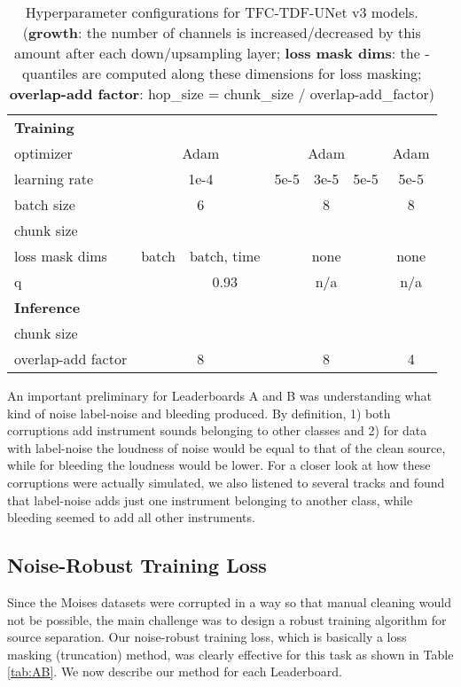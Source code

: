 \documentclass[10pt]{article}
\begin{document}
\begin{table*}[t]
\begin{tabular}{l|cc|ccc|c}
\hline
\textbf{Training} &  &  &  &  &  &  \\
\multicolumn{1}{l|}{optimizer} & \multicolumn{2}{c|}{Adam} & \multicolumn{3}{c|}{Adam} & Adam\\
\multicolumn{1}{l|}{learning rate} & \multicolumn{2}{c|}{1e-4} & 5e-5 & 3e-5 & 5e-5 & 5e-5\\
\multicolumn{1}{l|}{batch size} & \multicolumn{2}{c|}{6} & \multicolumn{3}{c|}{8} & 8\\
\multicolumn{1}{l|}{chunk size} & \multicolumn{2}{c|}{} & \multicolumn{3}{c|}{} & \\
loss mask dims & batch & batch, time & \multicolumn{3}{c|}{none} & none\\ 
q &  & 0.93 & \multicolumn{3}{c|}{n/a} & n/a\\

\hline
\textbf{Inference} &  &  &  &  &  &  \\
\multicolumn{1}{l|}{chunk size} & \multicolumn{2}{c|}{} & \multicolumn{3}{c|}{} & \\
\multicolumn{1}{l|}{overlap-add factor} & \multicolumn{2}{c|}{8} & \multicolumn{3}{c|}{8} & 4\\ 

\hline
\hline
\end{tabular}
\caption{
Hyperparameter configurations for TFC-TDF-UNet v3 models.  
(\textbf{growth}: the number of channels is increased/decreased by this amount after each down/upsampling layer; 
\textbf{loss mask dims}: the -quantiles are computed along these dimensions for loss masking;
\textbf{overlap-add factor}: hop\_size = chunk\_size / overlap-add\_factor)
}
\label{tab:cfg}
\end{table*}
\endgroup


An important preliminary for Leaderboards A and B was understanding what kind of noise label-noise and bleeding produced. By definition, 1) both corruptions add instrument sounds belonging to other classes and 2) for data with label-noise the loudness of noise would be equal to that of the clean source, while for bleeding the loudness would be lower. For a closer look at how these corruptions were actually simulated, we also listened to several tracks and found that label-noise adds just one instrument belonging to another class, while bleeding seemed to add all other instruments. 





\subsection{Noise-Robust Training Loss}
\label{ssec:ab_method}
Since the Moises datasets were corrupted in a way so that manual cleaning would not be possible, 
the main challenge was to design a robust training algorithm for source separation. Our noise-robust training loss, which is basically a loss masking (truncation) method, was clearly effective for this task as shown in Table \ref{tab:AB}. We now describe our method for each Leaderboard.
\end{document}
